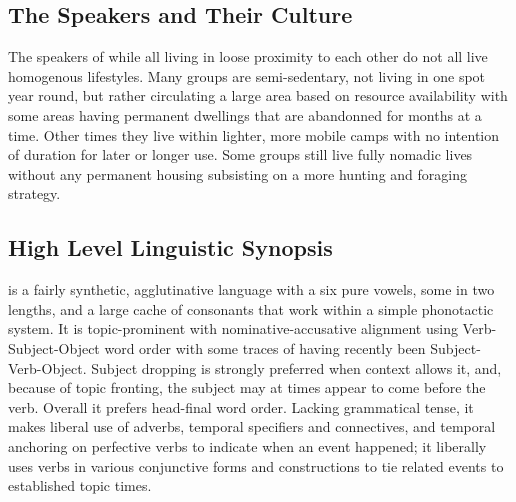 \subsection{The Speakers and Their Culture}
  The speakers of \langname while all living in loose proximity to each other do not all live homogenous lifestyles. Many groups are semi-sedentary, not living in one spot year round, but rather circulating a large area based on resource availability with some areas having permanent dwellings that are abandonned for months at a time. Other times they live within lighter, more mobile camps with no intention of duration for later or longer use. Some groups still live fully nomadic lives without any permanent housing subsisting on a more hunting and foraging strategy.

\subsection{High Level Linguistic Synopsis}
  \langname is a fairly synthetic, agglutinative language with a six pure vowels, some in two lengths, and a large cache of consonants that work within a simple phonotactic system. It is topic-prominent with nominative-accusative alignment using Verb-Subject-Object word order with some traces of having recently been Subject-Verb-Object. Subject dropping is strongly preferred when context allows it, and, because of topic fronting, the subject may at times appear to come before the verb. Overall it prefers head-final word order. Lacking grammatical tense, it makes liberal use of adverbs, temporal specifiers and connectives, and temporal anchoring on perfective verbs to indicate when an event happened; it liberally uses verbs in various conjunctive forms and constructions to tie related events to established topic times.\par
